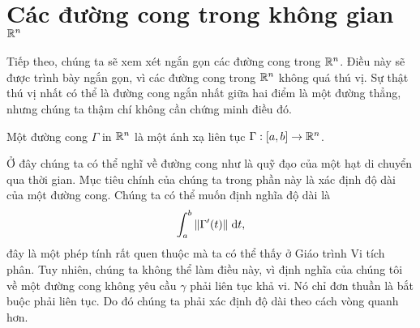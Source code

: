 \section{Các đường cong trong không gian $\mathbb{R}^n$}

Tiếp theo, chúng ta sẽ xem xét ngắn gọn các đường cong trong $\mathbb{R}^n $. Điều này sẽ được trình bày ngắn gọn, vì các đường cong trong $\mathbb{R}^n $ không quá thú vị. Sự thật thú vị nhất có thể là đường cong ngắn nhất giữa hai điểm là một đường thẳng, nhưng chúng ta thậm chí không cần chứng minh điều đó.

\begin{defi}[Curve]
  Một đường cong $\Gamma$ in $\mathbb{R}^n$ là một ánh xạ liên tục $\Gamma: [a, b] \to \mathbb{R}^n$.
\end{defi}
Ở đây chúng ta có thể nghĩ về đường cong như là quỹ đạo của một hạt di chuyển qua thời gian. Mục tiêu chính của chúng ta trong phần này là xác định độ dài của một đường cong. Chúng ta có thể muốn định nghĩa độ dài là
\[
  \int_a^b \|\Gamma'(t)\|\;\mathrm{d} t,
\]
đây là một phép tính rất quen thuộc mà ta có thể thấy ở Giáo trình Vi tích phân. Tuy nhiên, chúng ta không thể làm điều này, vì định nghĩa của chúng tôi về một đường cong không yêu cầu $\gamma$ phải liên tục khả vi. Nó chỉ đơn thuần là bắt buộc phải liên tục. Do đó chúng ta phải xác định độ dài theo cách vòng quanh hơn.

